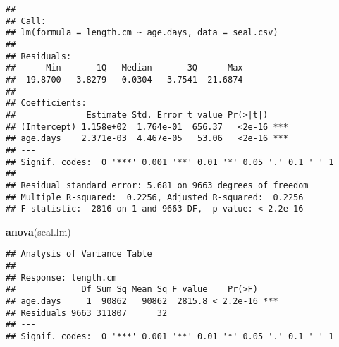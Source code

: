 \documentclass[]{article}
\newenvironment{Shaded}{\begin{snugshade}}{\end{snugshade}}
\newcommand{\KeywordTok}[1]{\textcolor[rgb]{0.13,0.29,0.53}{\textbf{#1}}}
\newcommand{\DataTypeTok}[1]{\textcolor[rgb]{0.13,0.29,0.53}{#1}}
\newcommand{\DecValTok}[1]{\textcolor[rgb]{0.00,0.00,0.81}{#1}}
\newcommand{\FloatTok}[1]{\textcolor[rgb]{0.00,0.00,0.81}{#1}}
\newcommand{\StringTok}[1]{\textcolor[rgb]{0.31,0.60,0.02}{#1}}
\newcommand{\OtherTok}[1]{\textcolor[rgb]{0.56,0.35,0.01}{#1}}
\newcommand{\OperatorTok}[1]{\textcolor[rgb]{0.81,0.36,0.00}{\textbf{#1}}}
\newcommand{\NormalTok}[1]{#1}
\begin{document}
\begin{Shaded}
\end{Shaded}

\begin{verbatim}
## 
## Call:
## lm(formula = length.cm ~ age.days, data = seal.csv)
## 
## Residuals:
##      Min       1Q   Median       3Q      Max 
## -19.8700  -3.8279   0.0304   3.7541  21.6874 
## 
## Coefficients:
##              Estimate Std. Error t value Pr(>|t|)    
## (Intercept) 1.158e+02  1.764e-01  656.37   <2e-16 ***
## age.days    2.371e-03  4.467e-05   53.06   <2e-16 ***
## ---
## Signif. codes:  0 '***' 0.001 '**' 0.01 '*' 0.05 '.' 0.1 ' ' 1
## 
## Residual standard error: 5.681 on 9663 degrees of freedom
## Multiple R-squared:  0.2256, Adjusted R-squared:  0.2256 
## F-statistic:  2816 on 1 and 9663 DF,  p-value: < 2.2e-16
\end{verbatim}

\begin{Shaded}
\begin{Highlighting}[]
\KeywordTok{anova}\NormalTok{(seal.lm)}
\end{Highlighting}
\end{Shaded}

\begin{verbatim}
## Analysis of Variance Table
## 
## Response: length.cm
##             Df Sum Sq Mean Sq F value    Pr(>F)    
## age.days     1  90862   90862  2815.8 < 2.2e-16 ***
## Residuals 9663 311807      32                      
## ---
## Signif. codes:  0 '***' 0.001 '**' 0.01 '*' 0.05 '.' 0.1 ' ' 1
\end{verbatim}
\end{document}
